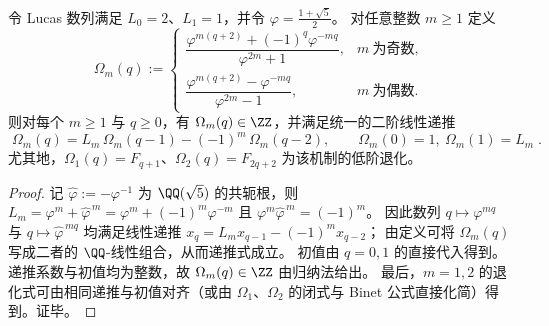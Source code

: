 \begin{conclusion}\label{con:xi-terminal-replica-softcore-lucas-pell-omega-unified}
令 Lucas 数列满足 \(L_0=2\)、\(L_1=1\)，并令 \(\varphi=\frac{1+\sqrt5}{2}\)。
对任意整数 \(m\ge 1\) 定义
\[
\Omega_m(q):=
\begin{cases}
\dfrac{\varphi^{m(q+2)}+(-1)^q\varphi^{-mq}}{\varphi^{2m}+1},& m\ \text{为奇数},\\[10pt]
\dfrac{\varphi^{m(q+2)}-\varphi^{-mq}}{\varphi^{2m}-1},& m\ \text{为偶数}.
\end{cases}
\]
则对每个 \(m\ge 1\) 与 \(q\ge 0\)，有 \(\Omega_m(q)\in\ZZ\)，并满足统一的二阶线性递推
\[
\boxed{\;
\Omega_m(q)=L_m\,\Omega_m(q-1)-(-1)^m\,\Omega_m(q-2),\qquad
\Omega_m(0)=1,\ \Omega_m(1)=L_m\; }.
\]
尤其地，\(\Omega_1(q)=F_{q+1}\)、\(\Omega_2(q)=F_{2q+2}\) 为该机制的低阶退化。
\end{conclusion}
\begin{proof}
记 \(\widehat\varphi:=-\varphi^{-1}\) 为 \(\QQ(\sqrt5)\) 的共轭根，则
\(
L_m=\varphi^m+\widehat\varphi^{\,m}=\varphi^m+(-1)^m\varphi^{-m}
\)
且
\(
\varphi^m\widehat\varphi^{\,m}=(-1)^m
\)。
因此数列 \(q\mapsto \varphi^{mq}\) 与 \(q\mapsto \widehat\varphi^{\,mq}\) 均满足线性递推
\(
x_q=L_m x_{q-1}-(-1)^m x_{q-2}
\)；
由定义可将 \(\Omega_m(q)\) 写成二者的 \(\QQ\)-线性组合，从而递推式成立。
初值由 \(q=0,1\) 的直接代入得到。
递推系数与初值均为整数，故 \(\Omega_m(q)\in\ZZ\) 由归纳法给出。
最后，\(m=1,2\) 的退化式可由相同递推与初值对齐（或由 \(\Omega_1\)、\(\Omega_2\) 的闭式与 Binet 公式直接化简）得到。证毕。
\end{proof}

